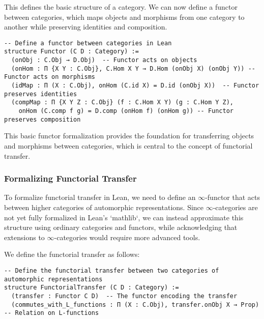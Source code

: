 \documentclass{article}
\theoremstyle{remark}
\begin{document}
This defines the basic structure of a category. We can now define a functor between categories, which maps objects and morphisms from one category to another while preserving identities and composition.

\begin{lstlisting}
-- Define a functor between categories in Lean
structure Functor (C D : Category) :=
  (onObj : C.Obj → D.Obj)  -- Functor acts on objects
  (onHom : Π {X Y : C.Obj}, C.Hom X Y → D.Hom (onObj X) (onObj Y)) -- Functor acts on morphisms
  (idMap : Π (X : C.Obj), onHom (C.id X) = D.id (onObj X))  -- Functor preserves identities
  (compMap : Π {X Y Z : C.Obj} (f : C.Hom X Y) (g : C.Hom Y Z),
    onHom (C.comp f g) = D.comp (onHom f) (onHom g)) -- Functor preserves composition
\end{lstlisting}

This basic functor formalization provides the foundation for transferring objects and morphisms between categories, which is central to the concept of functorial transfer.

\subsubsection{Formalizing Functorial Transfer}

To formalize functorial transfer in Lean, we need to define an $\infty$-functor that acts between higher categories of automorphic representations. Since $\infty$-categories are not yet fully formalized in Lean’s `mathlib`, we can instead approximate this structure using ordinary categories and functors, while acknowledging that extensions to $\infty$-categories would require more advanced tools.

We define the functorial transfer as follows:

\begin{lstlisting}
-- Define the functorial transfer between two categories of automorphic representations
structure FunctorialTransfer (C D : Category) :=
  (transfer : Functor C D)  -- The functor encoding the transfer
  (commutes_with_L_functions : Π (X : C.Obj), transfer.onObj X → Prop) -- Relation on L-functions
\end{lstlisting}
\end{document}
